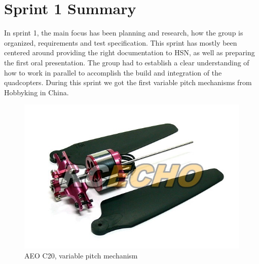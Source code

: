 
\section{Sprint 1 Summary}

In sprint 1, the main focus has been planning and research, how the group is organized, requirements and test specification. This sprint has mostly been centered around providing the right documentation to HSN, as well as preparing the first oral presentation. The group had to establish a clear understanding of how to work in parallel to accomplish the build and integration of the quadcopters.
\newline \newline
During this sprint we got the first variable pitch mechanisms from Hobbyking in China. 

\begin{figure}[h]
        \centering
         \begin{minipage}[b]{0.4\textwidth}
            \includegraphics[width = 1\textwidth]{VAPIQ-PICTURES/VPitchAeoc20}
              \caption{AEO C20, variable pitch mechanism}
            \label{fig:testpic2}
        \end{minipage}
        \hfill
        \begin{minipage}[b]{0.4\textwidth}

\end{minipage}
\end{figure}
